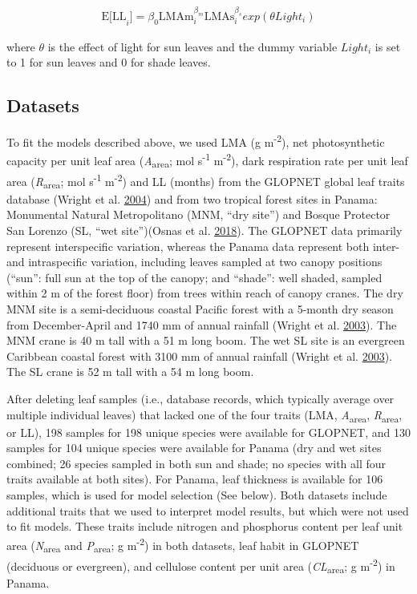 \documentclass[
  12pt,
]{article}
\begin{document}
\begin{align}
\mathrm{E[LL}_i] = \beta_0\mathrm{LMAm}_{i}^{\beta_m} \mathrm{LMAs}_{i}^{\beta_s} exp(\theta Light_i) \label{eq:E-LL2}
\end{align}

where \(\theta\) is the effect of light for sun leaves and the dummy variable \(Light_i\) is set to 1 for sun leaves and 0 for shade leaves.

\hypertarget{datasets}{%
\subsection{Datasets}\label{datasets}}

To fit the models described above, we used LMA (g m\textsuperscript{-2}), net photosynthetic capacity per unit leaf area (\emph{A}\textsubscript{area}; mol s\textsuperscript{-1} m\textsuperscript{-2}), dark respiration rate per unit leaf area (\emph{R}\textsubscript{area}; mol s\textsuperscript{-1} m\textsuperscript{-2}) and LL (months) from the GLOPNET global leaf traits database (Wright et al. \protect\hyperlink{ref-Wright2004a}{2004}) and from two tropical forest sites in Panama: Monumental Natural Metropolitano (MNM, ``dry site'') and Bosque Protector San Lorenzo (SL, ``wet site'')(Osnas et al. \protect\hyperlink{ref-Osnas2018}{2018}).
The GLOPNET data primarily represent interspecific variation, whereas the Panama data represent both inter- and intraspecific variation, including leaves sampled at two canopy positions (``sun'': full sun at the top of the canopy; and ``shade'': well shaded, sampled within 2 m of the forest floor) from trees within reach of canopy cranes.
The dry MNM site is a semi-deciduous coastal Pacific forest with a 5-month dry season from December-April and 1740 mm of annual rainfall (Wright et al. \protect\hyperlink{ref-Wright2003}{2003}).
The MNM crane is 40 m tall with a 51 m long boom. The wet SL site is an evergreen Caribbean coastal forest with 3100 mm of annual rainfall (Wright et al. \protect\hyperlink{ref-Wright2003}{2003}). The SL crane is 52 m tall with a 54 m long boom.

After deleting leaf samples (i.e., database records, which typically average over multiple individual leaves) that lacked one of the four traits (LMA, \emph{A}\textsubscript{area}, \emph{R}\textsubscript{area}, or LL), 198 samples for 198 unique species were available for GLOPNET, and 130 samples for 104 unique species were available for Panama (dry and wet sites combined; 26 species sampled in both sun and shade; no species with all four traits available at both sites).
For Panama, leaf thickness is available for 106 samples, which is used for model selection (See below).
Both datasets include additional traits that we used to interpret model results, but which were not used to fit models. These traits include nitrogen and phosphorus content per leaf unit area (\emph{N}\textsubscript{area} and \emph{P}\textsubscript{area}; g m\textsuperscript{-2}) in both datasets, leaf habit in GLOPNET (deciduous or evergreen), and cellulose content per unit area (\emph{CL}\textsubscript{area}; g m\textsuperscript{-2}) in Panama.
\end{document}
